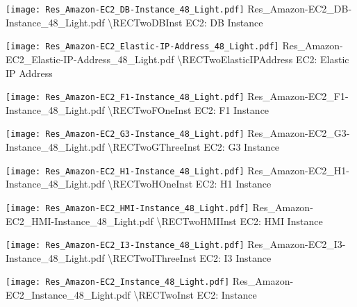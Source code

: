  {\texttt{[image: Res\_Amazon-EC2\_DB-Instance\_48\_Light.pdf]}} {Res\_Amazon-EC2\_DB-Instance\_48\_Light.pdf} {{\textbackslash}RECTwoDBInst} {EC2: DB Instance}

 {\texttt{[image: Res\_Amazon-EC2\_Elastic-IP-Address\_48\_Light.pdf]}} {Res\_Amazon-EC2\_Elastic-IP-Address\_48\_Light.pdf} {{\textbackslash}RECTwoElasticIPAddress} {EC2: Elastic IP Address}

 {\texttt{[image: Res\_Amazon-EC2\_F1-Instance\_48\_Light.pdf]}} {Res\_Amazon-EC2\_F1-Instance\_48\_Light.pdf} {{\textbackslash}RECTwoFOneInst} {EC2: F1 Instance}

 {\texttt{[image: Res\_Amazon-EC2\_G3-Instance\_48\_Light.pdf]}} {Res\_Amazon-EC2\_G3-Instance\_48\_Light.pdf} {{\textbackslash}RECTwoGThreeInst} {EC2: G3 Instance}

 {\texttt{[image: Res\_Amazon-EC2\_H1-Instance\_48\_Light.pdf]}} {Res\_Amazon-EC2\_H1-Instance\_48\_Light.pdf} {{\textbackslash}RECTwoHOneInst} {EC2: H1 Instance}

 {\texttt{[image: Res\_Amazon-EC2\_HMI-Instance\_48\_Light.pdf]}} {Res\_Amazon-EC2\_HMI-Instance\_48\_Light.pdf} {{\textbackslash}RECTwoHMIInst} {EC2: HMI Instance}

 {\texttt{[image: Res\_Amazon-EC2\_I3-Instance\_48\_Light.pdf]}} {Res\_Amazon-EC2\_I3-Instance\_48\_Light.pdf} {{\textbackslash}RECTwoIThreeInst} {EC2: I3 Instance}

 {\texttt{[image: Res\_Amazon-EC2\_Instance\_48\_Light.pdf]}} {Res\_Amazon-EC2\_Instance\_48\_Light.pdf} {{\textbackslash}RECTwoInst} {EC2: Instance}

